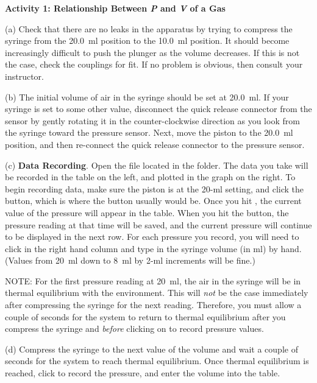 \textbf{Activity 1: Relationship Between \textit{P} and \textit{V} of a Gas}

(a) Check that there are no leaks in the apparatus by trying to compress
the syringe from the 20.0~ml position to the 10.0~ml position. It should become
increasingly difficult to push the plunger as the volume decreases. If this
is not the case, check the couplings for fit. If no problem is obvious, then
consult your instructor. 
\vspace{20mm}

(b) The initial volume of air in the syringe should be set at 20.0~ml. If your
syringe is set to some other value, disconnect the quick release connector from
the sensor by gently rotating it in the counter-clockwise direction as you look
from the syringe toward the pressure sensor. Next, move the piston to the
20.0~ml position, and then re-connect the quick release connector to the pressure
sensor. 

(c) \textbf{Data Recording}. Open the file  located in the 
\filename{\coursefolder} folder.  The data you take will be recorded in the table on the left, and plotted in the graph on the right.  To begin recording data, make sure the piston is at the 20-ml setting, and click
the  button, which is where the  button usually would be. 
Once you hit , the current value of the pressure will appear in the table.  
When you hit the  button, the pressure reading at that time will be saved, and the current pressure will continue to be displayed in the next row.  For each pressure you record, you will need to click in the right hand column and type in the syringe volume (in ml) by hand.  (Values from 20~ml down to 8~ml by 2-ml increments will be fine.)

NOTE: For the first pressure reading at 20~ml, the air in the syringe will be
in thermal equilibrium with the environment. This will \textit{not} be the case immediately
after compressing the syringe for the next reading. Therefore, you must allow
a couple of seconds for the system to return to thermal equilibrium after you 
compress the syringe and \textit{before} clicking on  to record pressure values. 

(d) Compress the syringe to the next value of the volume 
and wait a couple of seconds for the system to reach thermal equilibrium. Once 
thermal equilibrium is reached, click  to record the pressure, and enter the volume into the table.

